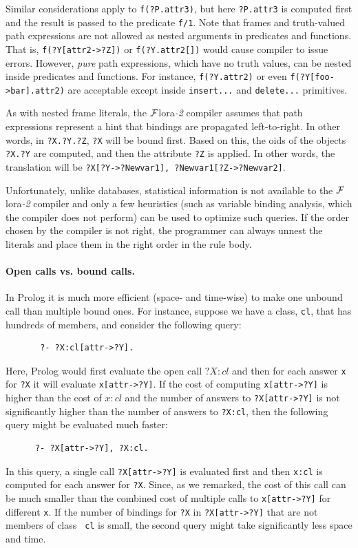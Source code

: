 \documentclass[11pt]{article}
\newcommand{\FLSYSTEM}{{\mbox{\sc ${\cal F}${lora}\rm\emph{-2}}}\xspace}
\begin{document}
Similar considerations apply to {\tt f(?P.attr3)}, but here
\texttt{?P.attr3} is computed first and the result is passed to the
predicate \texttt{f/1}.   
Note that frames and
truth-valued path expressions are not allowed as nested arguments
in predicates and functions. That is, \texttt{f(?Y[attr2->?Z])} or
\texttt{f(?Y.attr2[])} would cause compiler to issue errors. However,
\emph{pure} path expressions, which have no truth values, can be nested
inside predicates and functions. For instance, \texttt{f(?Y.attr2)} or 
even \texttt{f(?Y[foo->bar].attr2)} are acceptable except inside
\texttt{insert{...}}  and \texttt{delete{...}} primitives. 

As with nested frame literals, the \FLSYSTEM compiler assumes that path
expressions represent a hint that bindings are propagated left-to-right.
In other words, in {\tt ?X.?Y.?Z}, {\tt ?X} will be bound first.
Based on this, the oids of the objects {\tt ?X.?Y} are computed, and
then the attribute {\tt ?Z} is applied. In other words, the translation will
be {\tt ?X[?Y->?Newvar1], ?Newvar1[?Z->?Newvar2]}.

Unfortunately, unlike databases, statistical information is not
available to the \FLSYSTEM compiler and only a few heuristics (such as
variable binding analysis, which the compiler does not perform) can be used
to optimize such queries. If the order chosen by the compiler is not right,
the programmer can always unnest the literals and place them in the right
order in the rule body.

\paragraph{Open calls vs. bound calls.}
In Prolog it is much more efficient (space- and
time-wise) to make one unbound call than multiple bound ones. For instance,
suppose we have a class, {\tt cl}, that has hundreds of members, and
consider the following query:
\begin{verbatim}
       ?- ?X:cl[attr->?Y].  
\end{verbatim}
Here, Prolog would first evaluate the open call $?X:cl$ and then for each
answer {\tt x} for {\tt ?X} it will evaluate {\tt x[attr->?Y]}.
If the cost of computing {\tt x[attr->?Y]} is higher than the cost of $x:cl$
and the number of answers to {\tt ?X[attr->?Y]} is not significantly
higher than the number of answers to {\tt ?X:cl}, then the following query
might be evaluated much faster:
\begin{verbatim}
      ?- ?X[attr->?Y], ?X:cl.  
\end{verbatim}
In this query, a single call {\tt ?X[attr->?Y]} is evaluated first and then
{\tt x:cl} is computed for each answer for {\tt ?X}.  Since, as we remarked,
the cost of this call can be much smaller than the combined cost of
multiple calls to {\tt x[attr->?Y]} for different {\tt x}.  If the number of
bindings for {\tt ?X} in {\tt ?X[attr->?Y]} that are not members of class {\tt
  cl} is small, the second query might take significantly less space and
time.
\end{document}
